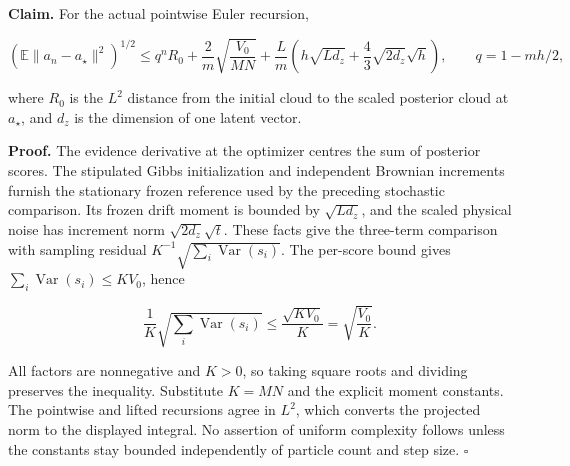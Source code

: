 \documentclass[11pt,a4paper]{report}
\begin{document}
\textbf{Claim.} For the actual pointwise Euler recursion,

\[\left(\mathbb E\|a_n-a_\star\|^2\right)^{1/2}\le q^nR_0+\frac2m\sqrt{\frac{V_0}{MN}}+\frac Lm\left(h\sqrt{L d_z}+\frac43\sqrt{2d_z}\sqrt h\right),\qquad q=1-mh/2,\]

where \(R_0\) is the \(L^2\) distance from the initial cloud to the scaled posterior cloud at \(a_\star\), and \(d_z\) is the dimension of one latent vector.



\textbf{Proof.} The evidence derivative at the optimizer centres the sum of posterior scores. The stipulated Gibbs initialization and independent Brownian increments furnish the stationary frozen reference used by the preceding stochastic comparison. Its frozen drift moment is bounded by \(\sqrt{Ld_z}\), and the scaled physical noise has increment norm \(\sqrt{2d_z}\sqrt t\). These facts give the three-term comparison with sampling residual \(K^{-1}\sqrt{\sum_i\operatorname{Var}(s_i)}\). The per-score bound gives \(\sum_i\operatorname{Var}(s_i)\le KV_0\), hence

\[\frac1K\sqrt{\sum_i\operatorname{Var}(s_i)}\le\frac{\sqrt{KV_0}}K=\sqrt{\frac{V_0}K}.\]

All factors are nonnegative and \(K>0\), so taking square roots and dividing preserves the inequality. Substitute \(K=MN\) and the explicit moment constants. The pointwise and lifted recursions agree in \(L^2\), which converts the projected norm to the displayed integral. No assertion of uniform complexity follows unless the constants stay bounded independently of particle count and step size. \(\square\)
\end{document}
